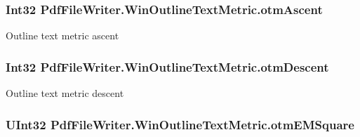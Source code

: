 \subsubsection[{\texorpdfstring{otm\+Ascent}{otmAscent}}]{\setlength{\rightskip}{0pt plus 5cm}Int32 Pdf\+File\+Writer.\+Win\+Outline\+Text\+Metric.\+otm\+Ascent\hspace{0.3cm}{\ttfamily [get]}}\hypertarget{class_pdf_file_writer_1_1_win_outline_text_metric_a361509c9f2da22866a958b85a864ac7e}{}\label{class_pdf_file_writer_1_1_win_outline_text_metric_a361509c9f2da22866a958b85a864ac7e}


Outline text metric ascent 

\subsubsection[{\texorpdfstring{otm\+Descent}{otmDescent}}]{\setlength{\rightskip}{0pt plus 5cm}Int32 Pdf\+File\+Writer.\+Win\+Outline\+Text\+Metric.\+otm\+Descent\hspace{0.3cm}{\ttfamily [get]}}\hypertarget{class_pdf_file_writer_1_1_win_outline_text_metric_af8798d1cc777a3fcb07642b655d81f12}{}\label{class_pdf_file_writer_1_1_win_outline_text_metric_af8798d1cc777a3fcb07642b655d81f12}


Outline text metric descent 

\subsubsection[{\texorpdfstring{otm\+E\+M\+Square}{otmEMSquare}}]{\setlength{\rightskip}{0pt plus 5cm}U\+Int32 Pdf\+File\+Writer.\+Win\+Outline\+Text\+Metric.\+otm\+E\+M\+Square\hspace{0.3cm}{\ttfamily [get]}}\hypertarget{class_pdf_file_writer_1_1_win_outline_text_metric_ade1240a0288d003931770cc1eca16733}{}\label{class_pdf_file_writer_1_1_win_outline_text_metric_ade1240a0288d003931770cc1eca16733}


